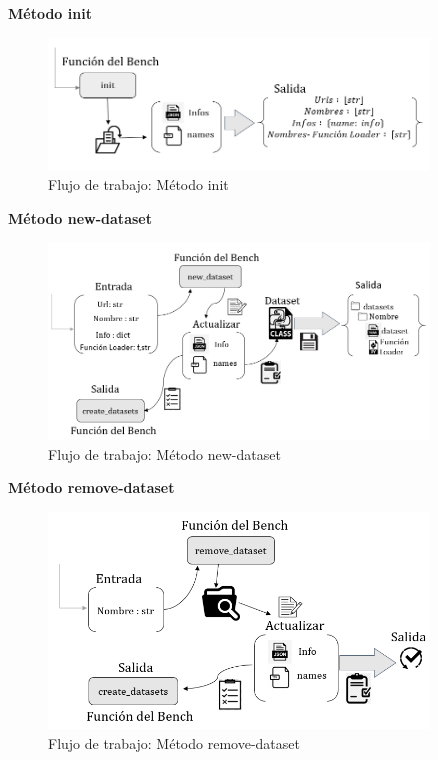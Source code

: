 \begin{flushleft} 
    { \textbf{Método init }}\label{section:init}
\end{flushleft}

 \begin{figure}[H]
    \centering
    \includegraphics[width=0.9\textwidth]{Graphics/methods/init.png}
    \caption{Flujo de trabajo: Método init}
    \label{fig:image2}
 \end{figure}

\begin{flushleft} 
    { \textbf{Método new-dataset }}\label{section:new}
\end{flushleft}

 \begin{figure}[H]
    \centering
    \includegraphics[width=0.9\textwidth]{Graphics/methods/new-dataset.png}
    \caption{Flujo de trabajo: Método new-dataset}
    \label{fig:image3}
 \end{figure}

 
\begin{flushleft} 
    { \textbf{Método remove-dataset }}\label{section:remove}
\end{flushleft}

 \begin{figure}[H]
    \centering
    \includegraphics[width=0.9\textwidth]{Graphics/methods/remove-dataset.png}
    \caption{Flujo de trabajo: Método remove-dataset}
    \label{fig:image4}
 \end{figure}

